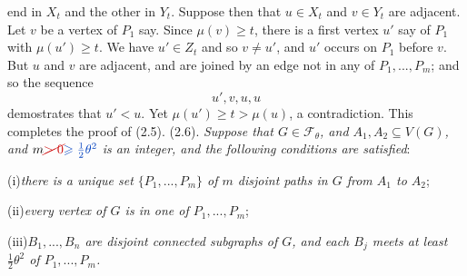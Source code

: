 \noindent end in $X_t$ and the other in $Y_t$. Suppose then that $u\in X_t$ and $v\in Y_t$ are
adjacent. Let $v$ be a vertex of $P_1$ say. Since $\mu(v)\ge t$, there is a first vertex $u'$
say of $P_1$ with $\mu(u')\ge t$. We have $u'\in Z_t$ and so $v\ne u'$, and $u'$ occurs on $P_1$
before $v$. But $u$ and $v$ are adjacent, and are joined by an edge not in any of
$P_1,..., P_m$; and so the sequence
\begin{equation*}
u', v, u, u
\end{equation*}
demostrates that $u'<u$. Yet $\mu(u')\ge t>\mu(u)$, a contradiction. This completes
the proof of (2.5).
\stmt
(2.6). \textit{Suppose that $G\in\mathscr{F}_\theta$, and $A_1, A_2\subseteq V(G)$, and $m\delm{>0}\fix{\ge\frac12\theta^2}$ is an integer,
and the following conditions are satisfied}:

\hspace*{12pt}(i)\enspace\textit{there is a unique set $\{P_1,..., P_m\}$ of $m$ disjoint paths in $G$ from $A_1$
to $A_2$};

\hspace*{12pt}(ii)\enspace\textit{every vertex of $G$ is in one of $P_1,..., P_m$};

\hspace*{12pt}(iii)\enspace\textit{$B_1,..., B_n$ are disjoint connected subgraphs of $G$, and each $B_j$
meets at least $\frac12\theta^2$ of $P_1,..., P_m$.}

